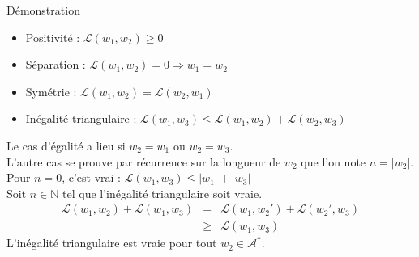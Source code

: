 \documentclass[gray,slidestop,compress,mathserif,smaller,fleqn]{beamer}
\begin{document}
\begin{frame}
  \begin{block}{Démonstration}
    \begin{itemize}
    \item Positivité : $\mathcal{L}(w_1, w_2) \geq 0 $
    \item Séparation : $\mathcal{L}(w_1, w_2) = 0 \Longrightarrow w_1 = w_2$
    \item Symétrie : $\mathcal{L}(w_1, w_2) = \mathcal{L}(w_2, w_1)$
    \item Inégalité triangulaire : $\mathcal{L}(w_1, w_3) \leq \mathcal{L}(w_1, w_2) + \mathcal{L}(w_2, w_3)$
    \end{itemize}
    Le cas d'égalité a lieu si $ w_2 = w_1 $ ou $ w_2 = w_3 $.\\
    L'autre cas se prouve par récurrence sur la longueur de $ w_2 $ que l'on note $ n = |w_2| $.\\
    Pour $ n = 0 $, c'est vrai : $\mathcal{ L}(w_1, w_3) \leq |w_1| + |w_3|$\\
    Soit $ n \in \mathbb{N} $ tel que l'inégalité triangulaire soit vraie.\\
    \begin{eqnarray*}
      \mathcal{L}(w_1, w_2) + \mathcal{L}(w_1, w_3) &=& \mathcal{L}(w_1, w_2') + \mathcal{L}(w_2', w_3)\\
                                                    &\geq& \mathcal{L}(w_1, w_3)
    \end{eqnarray*}
    L'inégalité triangulaire est vraie pour tout $ w_2 \in \mathcal{A^*}$.
  \end{block}
\end{frame}

\end{document}
